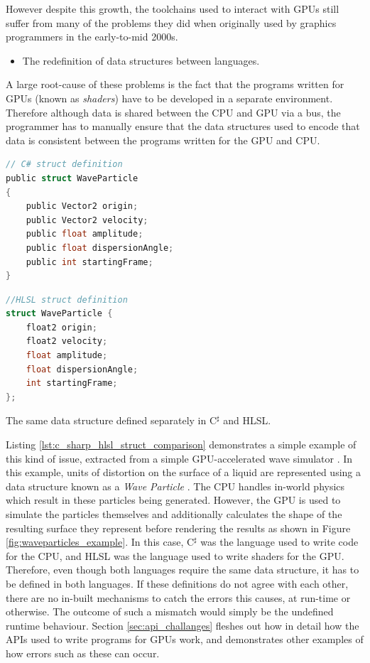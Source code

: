 \documentclass[a4paper,12pt,twoside,openright]{report}
\begin{document}
However despite this growth, the toolchains used to interact with GPUs still
suffer from many of the problems they did when originally used by graphics
programmers in the early-to-mid 2000s.

\begin{itemize}

    \item The redefinition of data structures between languages.

\end{itemize}

A large root-cause of these problems is the fact that the programs written for
GPUs (known as \textit{shaders}) have to be developed in a separate
environment. Therefore although data is shared between the CPU and GPU via a
bus, the programmer has to manually ensure that the data structures used to
encode that data is consistent between the programs written for the GPU and
CPU.

\begin{lstfloat}
\begin{lstlisting}[language=C]
// C# struct definition
public struct WaveParticle
{
    public Vector2 origin;
    public Vector2 velocity;
    public float amplitude;
    public float dispersionAngle;
    public int startingFrame;
}
\end{lstlisting}
\begin{lstlisting}[language=C]
//HLSL struct definition
struct WaveParticle {
    float2 origin;
    float2 velocity;
    float amplitude;
    float dispersionAngle;
    int startingFrame;
};
\end{lstlisting}
\label{lst:c_sharp_hlsl_struct_comparison}
\caption{The same data structure defined separately in C$^\sharp$ and HLSL.}
\end{lstfloat}

Listing \ref{lst:c_sharp_hlsl_struct_comparison} demonstrates a simple example
of this kind of issue, extracted from a simple GPU-accelerated wave simulator
\cite{WaveParticlesGPU}. In this example, units of distortion on the surface of
a liquid are represented using a data structure known as a \textit{Wave
Particle} \cite{WaveParticlesOriginalPaper}. The CPU handles in-world physics
which result in these particles being generated. However, the GPU is used to
simulate the particles themselves and additionally calculates the shape of the
resulting surface they represent before rendering the results as shown in
Figure \ref{fig:waveparticles_example}. In this case, C$^\sharp$ was the
language used to write code for the CPU, and HLSL was the language used to
write shaders for the GPU. Therefore, even though both languages require the
same data structure, it has to be defined in both languages. If these
definitions do not agree with each other, there are no in-built mechanisms to
catch the errors this causes, at run-time or otherwise. The outcome of such a
mismatch would simply be the undefined runtime behaviour. Section
\ref{sec:api_challanges} fleshes out how in detail how the APIs used to write
programs for GPUs work, and demonstrates other examples of how errors such as
these can occur.
\end{document}

